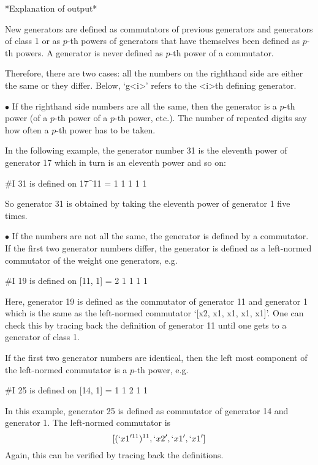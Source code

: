*Explanation of output*

New  generators are  defined as  commutators of  previous  generators and
generators  of  class 1  or  as $p$-th  powers  of  generators that  have
themselves been defined as $p$-th powers. A generator is never defined as
$p$-th power of a commutator.

Therefore, there are two cases: all the numbers on the righthand side are
either the same or  they  differ.  Below,  `g<i>'  refers  to  the  <i>th
defining generator.

\beginlist%

\item{$\bullet$}
If the righthand side numbers are all the same, then the generator  is  a
$p$-th power (of a $p$-th power of a $p$-th power, etc.). The  number  of
repeated digits say how often a $p$-th power has to be taken.

In the following example, the generator number 31 is the  eleventh  power
of generator 17 which in turn is an eleventh power and so on:

\begintt
#I  31 is defined on 17^11 = 1 1 1 1 1 
\endtt
                    
So generator 31 is obtained by taking the eleventh power of  generator  1
five times.

\item{$\bullet$}
If the numbers are not all the same, the generator is defined by a
commutator.   If the first two generator numbers differ, the generator is
defined as a left-normed commutator of the weight one generators, e.g.

\begintt
#I  19 is defined on [11, 1] = 2 1 1 1 1    
\endtt
        
Here, generator 19 is defined as  the  commutator  of  generator  11  and
generator  1  which  is  the   same   as   the   left-normed   commutator
`[x2, x1, x1, x1, x1]'. One can check this by tracing back the definition
of generator 11 until one gets to a generator of class 1.


If the first two generator numbers are identical, then the left most
component of the left-normed commutator is a $p$-th power, e.g.

\begintt
#I  25 is defined on [14, 1] = 1 1 2 1 1 
\endtt

In this example, generator 25 is defined as commutator  of  generator  14
and generator 1. The left-normed commutator is
$$
[(`x1'^{11})^{11}, `x2', `x1', `x1']
$$
Again, this can be verified by tracing back the definitions.

